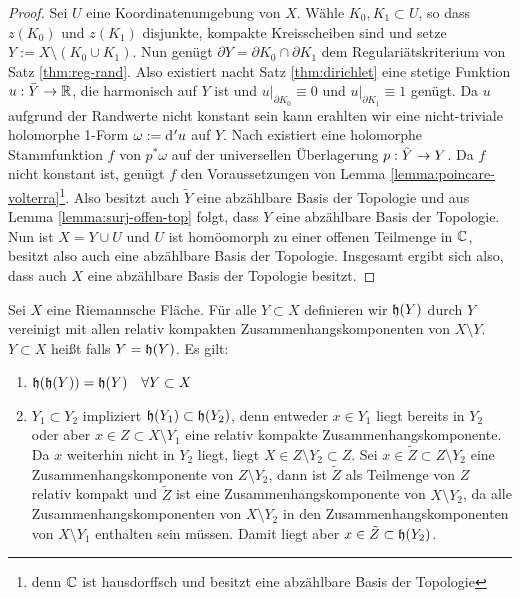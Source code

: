 \begin{proof}
  Sei $U$ eine Koordinatenumgebung von $X$. Wähle $K_0, K_1 \subset
  U$, so dass $z(K_0)$ und $z(K_1)$ disjunkte, kompakte Kreisscheiben
  sind und setze $Y := X \setminus (K_0 \cup K_1)$. 
  Nun genügt $\partial Y = \partial K_0 \cap \partial K_1$ dem
  Regulariätskriterium von Satz \ref{thm:reg-rand}. Also existiert
  nacht Satz \ref{thm:dirichlet} eine stetige
  Funktion $u: \bar Y \rightarrow \mathbb{R}$, die harmonisch auf $Y$ ist und
  $u|_{\partial K_0} \equiv 0$ und $u|_{\partial K_1} \equiv 1$
  genügt. Da $u$ aufgrund der Randwerte nicht konstant sein kann erahlten wir
  eine nicht-triviale holomorphe 1-Form $\omega := \d['u]$ auf $Y$. 
  Nach \cite[Kor. 10.6]{For} existiert eine holomorphe Stammfunktion
  $f$ von $p^\ast\omega$ auf der universellen Überlagerung $p: \tilde
  Y \rightarrow Y$. Da $f$ nicht konstant ist, genügt $f$ den Voraussetzungen von
  Lemma \ref{lemma:poincare-volterra}\footnote{denn $\mathbb{C}$ ist hausdorffsch
  und besitzt eine abzählbare Basis der Topologie}. Also besitzt auch
  $\tilde Y$ eine abzählbare Basis der Topologie und aus
  Lemma \ref{lemma:surj-offen-top} folgt, dass $Y$ eine abzählbare
  Basis der Topologie. Nun ist $X = Y \cup U$ und $U$ ist homöomorph
  zu einer offenen Teilmenge in $\mathbb{C}$, besitzt also auch eine
  abzählbare Basis der Topologie. 
  Insgesamt ergibt sich also, dass auch $X$ eine abzählbare Basis der
  Topologie besitzt.
\end{proof}

\begin{defin}
  Sei $X$ eine Riemannsche Fläche. Für alle $Y \subset X$ definieren
  wir $\mathfrak{h}(Y)$ durch $Y$ vereinigt mit allen relativ kompakten
  Zusammenhangskomponenten von $X \setminus Y$. $Y \subset X$ heißt
   falls $Y = \mathfrak{h}(Y)$. Es gilt:
  \begin{enumerate}
  \item $\mathfrak{h}(\mathfrak{h}(Y)) = \mathfrak{h}(Y) \quad \forall Y \subset X$ 
  \item $Y_1 \subset Y_2$ impliziert $\mathfrak{h}(Y_1) \subset
    \mathfrak{h}(Y_2)$, denn entweder $x \in Y_1$ liegt bereits in $Y_2$
    oder aber $x \in Z \subset X \setminus Y_1$ eine relativ kompakte
    Zusammenhangskomponente. Da $x$ weiterhin nicht in $Y_2$ liegt,
    liegt $X \in Z \setminus Y_2 \subset Z$. Sei $x \in \tilde Z
    \subset Z \setminus Y_2$ eine Zusammenhangskomponente von $Z
    \setminus Y_2$, dann ist $\tilde Z$ als Teilmenge von $Z$ relativ
    kompakt und $\tilde Z$ ist eine Zusammenhangskomponente von $X
    \setminus Y_2$, da alle Zusammenhangskomponenten von $X \setminus
    Y_2$ in den Zusammenhangskomponenten von $X \setminus Y_1$
    enthalten sein müssen. Damit liegt aber $x \in \tilde Z \subset \mathfrak{h}(Y_2)$.
  \end{enumerate}
\end{defin}

